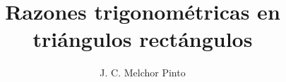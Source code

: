 \documentclass[12pt]{guia}
\title{Razones trigonométricas en triángulos rectángulos}
\author{J. C. Melchor Pinto}
\begin{document}
\pagestyle{headandfoot}
\addpoints
\INFO
\printanswers
\vspace{-0.9cm}
\begin{multicols}{2}
    \columnbreak
\end{multicols}
%
% 
% 
\begin{questions}
    \questionboxed[10] 
    \questionboxed[10] 
    \questionboxed[10] 
    \questionboxed[10] 
    \questionboxed[10] 
    \questionboxed[10] 
    \questionboxed[10] 
    \questionboxed[10] 
    \questionboxed[10] 
    \questionboxed[10] 
    \questionboxed[10] 
    \questionboxed[10] 
    \questionboxed[10] 
    \questionboxed[10] 
    \questionboxed[10] 
    \questionboxed[10] 
    \questionboxed[10] 
    \questionboxed[10] 
\end{questions}
\end{document}
